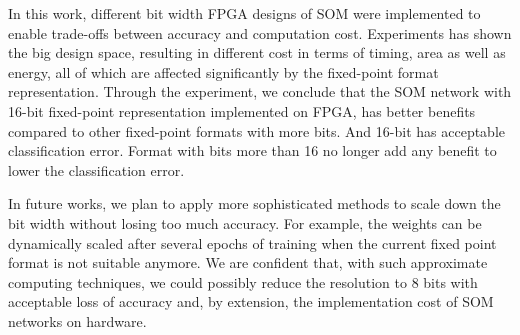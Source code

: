 In this work, different bit width FPGA designs of SOM were implemented to enable trade-offs between accuracy and computation cost. Experiments has shown the big design space, resulting in different cost in terms of timing, area as well as energy, all of which are affected significantly by the fixed-point format representation. Through the experiment, we conclude that the SOM network with 16-bit fixed-point representation implemented on FPGA, has better benefits compared to other fixed-point formats with more bits. And 16-bit has acceptable classification error. Format with bits more than 16 no longer add any benefit to lower the classification error. 

In future works, we plan to apply more sophisticated methods to scale down the bit width without losing too much accuracy. For example, the weights can be dynamically scaled after several epochs of training when the current fixed point format is not suitable anymore. We are confident that, with such approximate computing techniques, we could possibly reduce the resolution to 8 bits with acceptable loss of accuracy and, by extension, the implementation cost of SOM networks on hardware.